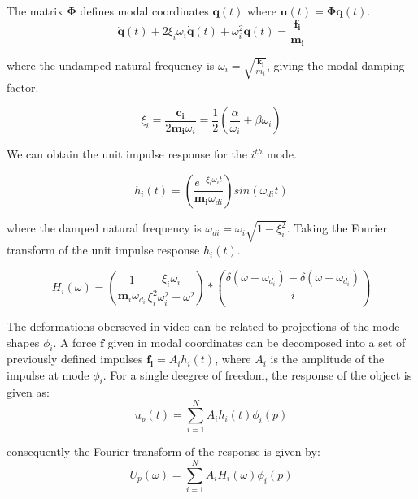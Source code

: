 \documentclass{article}
\begin{document}
The matrix $\mathbf{\Phi}$ defines modal coordinates $\mathbf{q}(t)$ where $\mathbf{u}(t) = \mathbf{\Phi q}(t)$.
\begin{equation*}
    \mathbf{\ddot{q}}(t) + 2\xi_{i}\omega_{i}\mathbf{\dot{q}}(t) + \omega_{i}^{2}\mathbf{q}(t) = \frac{\mathbf{f_{i}}}{\mathbf{m_{i}}}
\end{equation*}

where the undamped natural frequency is $\omega_{i} = \sqrt{\frac{\mathbf{k_{i}}}{m_{i}}}$, giving the modal damping factor.

\begin{equation*}
    \xi_{i} = \frac{\mathbf{c_{i}}}{2\mathbf{m_{i}}\omega_{i}} = \frac{1}{2}\left(\frac{\alpha}{\omega_{i}} + \beta\omega_{i}\right)
\end{equation*}

We can obtain the unit impulse response for the $i^{th}$ mode.

\begin{equation*}
    h_{i}(t) = \left(\frac{e^{-\xi_{i}\omega_{i}t}}{\mathbf{m_{i}}\omega_{di}}\right) sin{(\omega_{di}t)}
\end{equation*}

where the damped natural frequency is $\omega_{di} = \omega_{i} \sqrt{1 - \xi^{2}_{i}}$. Taking the Fourier transform of the unit impulse response $h_{i}(t)$.

\begin{equation*}
    H_{i}(\omega) = \left(\frac{1}{\mathbf{m}_i\omega_{d_{i}}} \frac{\xi_{i}\omega_{i}}{\xi_{i}^{2}\omega_{i}^{2} + \omega^{2}}\right) \ast \left(\frac{\delta(\omega - \omega_{d_{i}}) - \delta(\omega + \omega_{d_{i}})}{i}\right)
\end{equation*}

The deformations oberseved in video can be related to projections of the mode shapes $\phi_{i}$. A force $\mathbf{f}$ given in modal coordinates can be decomposed into a set of previously defined impulses $\mathbf{f_{i}} = A_{i}h_{i}(t)$, where $A_{i}$ is the amplitude of the impulse at mode $\phi_{i}$. For a single deegree of freedom, the response of the object is given as:
\begin{equation*}
    u_{p}(t) = \sum_{i=1}^{N} A_{i}h_{i}(t)\phi_{i}(p)
\end{equation*}

consequently the Fourier transform of the response is given by:
\begin{equation*}
    U_{p}(\omega) = \sum_{i=1}^{N} A_{i}H_{i}(\omega)\phi_{i}(p)
\end{equation*}
\end{document}
